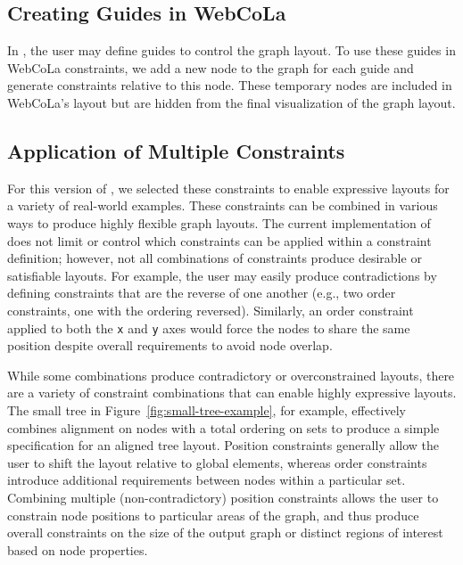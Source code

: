 \subsection{Creating Guides in WebCoLa}

In \projectname, the user may define guides to control the graph layout.
To use these guides in WebCoLa constraints, we add a new node to the graph
for each guide and generate constraints relative to this node. These 
temporary nodes are included in WebCoLa's layout but are hidden from the
final visualization of the graph layout.

\subsection{Application of Multiple Constraints}
\syphilisLayout
\syphilisSpec
For this version of \projectname, we selected these constraints to enable
expressive layouts for a variety of real-world examples. These constraints
can be combined in various ways to produce highly flexible graph layouts.
The current implementation of \projectname does not limit or control which
constraints can be applied within a constraint definition; however, not
all combinations of constraints produce desirable or satisfiable layouts.
For example, the user may easily produce contradictions by defining constraints
that are the reverse of one another (e.g., two order constraints, one with the
ordering reversed). Similarly, an order constraint applied to both the \texttt{x}
and \texttt{y} axes would force the nodes to share the same position despite
overall requirements to avoid node overlap. 

While some combinations produce contradictory or overconstrained layouts,
there are a variety of constraint combinations that can enable highly 
expressive layouts. The small tree in Figure~\ref{fig:small-tree-example}, for 
example, effectively combines alignment on nodes with a total ordering on sets 
to produce a simple specification for an aligned tree layout. Position constraints
generally allow the user to shift the layout relative to global elements,
whereas order constraints introduce additional requirements between nodes
within a particular set. Combining multiple (non-contradictory) position
constraints allows the user to constrain node positions to particular
areas of the graph, and thus produce overall constraints on the size of the
output graph or distinct regions of interest based on node properties.

